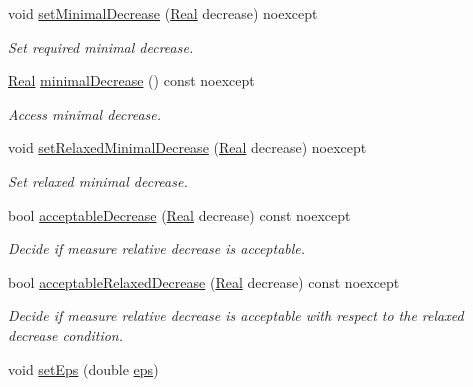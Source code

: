 \begin{DoxyCompactItemize}
void \hyperlink{classSpacy_1_1Mixin_1_1DecreaseCondition_aabc5e2473edace0c87da7fbd9fa0ae61_aabc5e2473edace0c87da7fbd9fa0ae61}{set\+Minimal\+Decrease} (\hyperlink{classSpacy_1_1Real}{Real} decrease) noexcept
\begin{DoxyCompactList}\small\item\em Set required minimal decrease. \end{DoxyCompactList}\item 
\hyperlink{classSpacy_1_1Real}{Real} \hyperlink{classSpacy_1_1Mixin_1_1DecreaseCondition_aeeda8b1d9f177fe5dd532e42de09ab44_aeeda8b1d9f177fe5dd532e42de09ab44}{minimal\+Decrease} () const noexcept
\begin{DoxyCompactList}\small\item\em Access minimal decrease. \end{DoxyCompactList}\item 
void \hyperlink{classSpacy_1_1Mixin_1_1DecreaseCondition_a86d6a8c8fc683c31572fd818a102a362_a86d6a8c8fc683c31572fd818a102a362}{set\+Relaxed\+Minimal\+Decrease} (\hyperlink{classSpacy_1_1Real}{Real} decrease) noexcept
\begin{DoxyCompactList}\small\item\em Set relaxed minimal decrease. \end{DoxyCompactList}\item 
bool \hyperlink{classSpacy_1_1Mixin_1_1DecreaseCondition_a69c0c90daf14fc40461876f71c49ffc2_a69c0c90daf14fc40461876f71c49ffc2}{acceptable\+Decrease} (\hyperlink{classSpacy_1_1Real}{Real} decrease) const noexcept
\begin{DoxyCompactList}\small\item\em Decide if measure relative decrease is acceptable. \end{DoxyCompactList}\item 
bool \hyperlink{classSpacy_1_1Mixin_1_1DecreaseCondition_a5ffb5bc008544db96d935a0ca34dcd24_a5ffb5bc008544db96d935a0ca34dcd24}{acceptable\+Relaxed\+Decrease} (\hyperlink{classSpacy_1_1Real}{Real} decrease) const noexcept
\begin{DoxyCompactList}\small\item\em Decide if measure relative decrease is acceptable with respect to the relaxed decrease condition. \end{DoxyCompactList}\item 
void \hyperlink{classSpacy_1_1Mixin_1_1Eps_a1bbfd62541610d5d80f2782ab77158e4_a1bbfd62541610d5d80f2782ab77158e4}{set\+Eps} (double \hyperlink{classSpacy_1_1Mixin_1_1Eps_a40e2ba8f3abd2b5370ef41238cfaaf8b_a40e2ba8f3abd2b5370ef41238cfaaf8b}{eps})

\end{DoxyCompactItemize}
